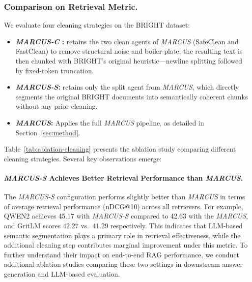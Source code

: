 \documentclass[11pt]{article}
\newcommand{\mymethod}{\emph{MARCUS}}
\newcommand{\clean}{\emph{MARCUS-C}}
\newcommand{\splits}{\emph{MARCUS-S}}
\begin{document}
\subsubsection{Comparison on Retrieval Metric.}  
We evaluate four cleaning strategies on the BRIGHT dataset:
\begin{itemize}
    \item \textbf{\clean{} :} retains the two clean agents of \mymethod{} (SafeClean and FastClean) to remove structural noise and boiler-plate; the resulting text is then chunked with BRIGHT’s original heuristic—newline splitting followed by fixed-token truncation.

    \item \textbf{\splits{}:} retains only the split agent from \mymethod{}, which directly segments the original BRIGHT documents into semantically coherent chunks without any prior cleaning.

    \item \textbf{\mymethod{}:} Applies the full \mymethod{} pipeline, as detailed in Section~\ref{sec:method}.

\end{itemize}


Table~\ref{tab:ablation-cleaning} presents the ablation study comparing different cleaning strategies. Several key observations emerge:

\paragraph{\splits{} Achieves Better Retrieval Performance than \mymethod{}.}

The \splits{} configuration performs slightly better than \mymethod{} in terms of average retrieval performance (nDCG@10) across all retrievers. For example, QWEN2 achieves 45.17 with \splits{} compared to 42.63 with the \mymethod{}, and GritLM scores 42.27 vs.\ 41.29 respectively. This indicates that LLM-based semantic segmentation plays a primary role in retrieval effectiveness, while the additional cleaning step contributes marginal improvement under this metric. To further understand their impact on end-to-end RAG performance, we conduct additional ablation studies comparing these two settings in downstream answer generation and LLM-based evaluation.
\end{document}
